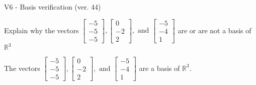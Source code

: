 \begin{exercise}
  \begin{exerciseTitle}V6 - Basis verification (ver. 44)\end{exerciseTitle}
  \begin{exerciseStatement}
    Explain why the vectors \(\left[\begin{array}{r}
-5 \\
-5 \\
-5
\end{array}\right] , \left[\begin{array}{r}
0 \\
-2 \\
2
\end{array}\right] , \text{ and } \left[\begin{array}{r}
-5 \\
-4 \\
1
\end{array}\right]\) are or are not a basis of \(\mathbb{R}^3\)	


  \end{exerciseStatement}
  \begin{exerciseAnswer}
   The vectors \(\left[\begin{array}{r}
-5 \\
-5 \\
-5
\end{array}\right] , \left[\begin{array}{r}
0 \\
-2 \\
2
\end{array}\right] , \text{ and } \left[\begin{array}{r}
-5 \\
-4 \\
1
\end{array}\right]\) 
  	 are  a basis of \(\mathbb{R}^3\).
  


  \end{exerciseAnswer}
\end{exercise}